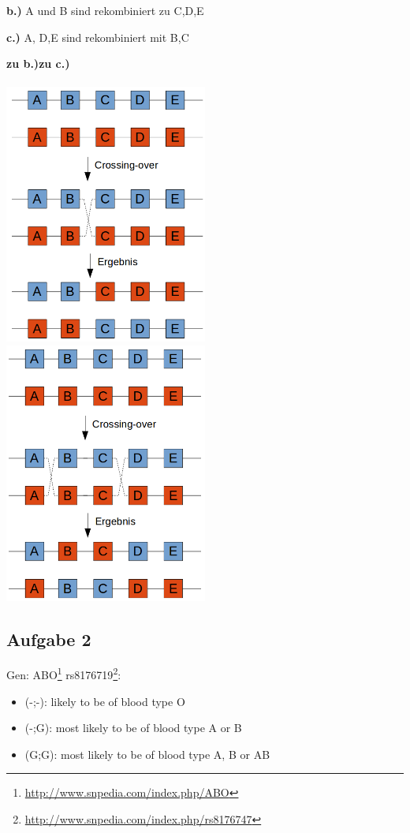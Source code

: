 \documentclass[13pt,a4paper]{article}
\begin{document}
\textbf{b.)} A und B sind rekombiniert zu C,D,E

\textbf{c.)} A, D,E sind rekombiniert mit B,C

\textbf{zu b.)}\hspace*{65mm}\textbf{zu c.)}\\\\
\includegraphics[width=0.5\textwidth]{crossing_over_b.png}
\includegraphics[width=0.5\textwidth]{crossing_over_c.png}

\subsection{Aufgabe 2}
Gen: ABO\footnote{\url{http://www.snpedia.com/index.php/ABO}}
rs8176719\footnote{\url{http://www.snpedia.com/index.php/rs8176747}}:
\begin{itemize}
	\item (-;-): likely to be of blood type O
	\item (-;G): most likely to be of blood type A or B
	\item (G;G): most likely to be of blood type A, B or AB 
\end{itemize}
\end{document}

